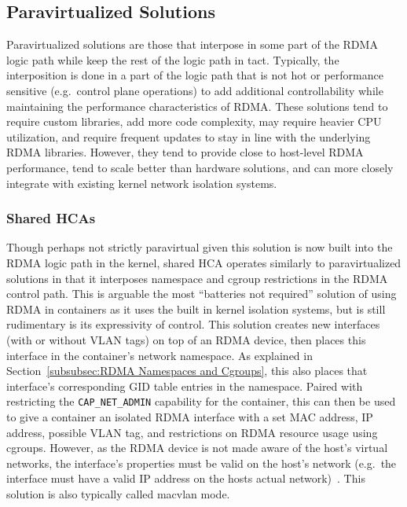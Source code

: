 \documentclass[12pt,titlepage]{article}
\begin{document}
\subsection{Paravirtualized Solutions}
Paravirtualized solutions are those that interpose in some part of the RDMA logic path while keep the rest of the logic path in tact.
Typically, the interposition is done in a part of the logic path that is not hot or performance sensitive (e.g.\ control plane operations) to add additional controllability while maintaining the performance characteristics of RDMA\@.
These solutions tend to require custom libraries, add more code complexity, may require heavier CPU utilization, and require frequent updates to stay in line with the underlying RDMA libraries.
However, they tend to provide close to host-level RDMA performance, tend to scale better than hardware solutions, and can more closely integrate with existing kernel network isolation systems.

\subsubsection{Shared HCAs}
Though perhaps not strictly paravirtual given this solution is now built into the RDMA logic path in the kernel, shared HCA operates similarly to paravirtualized solutions in that it interposes namespace and cgroup restrictions in the RDMA control path.
This is arguable the most ``batteries not required'' solution of using RDMA in containers as it uses the built in kernel isolation systems, but is still rudimentary is its expressivity of control.
This solution creates new interfaces (with or without VLAN tags) on top of an RDMA device, then places this interface in the container's network namespace.
As explained in Section~\ref{subsubsec:RDMA Namespaces and Cgroups}, this also places that interface's corresponding GID table entries in the namespace.
Paired with restricting the \texttt{CAP\_NET\_ADMIN} capability for the container, this can then be used to give a container an isolated RDMA interface with a set MAC address, IP address, possible VLAN tag, and restrictions on RDMA resource usage using cgroups.
However, as the RDMA device is not made aware of the host's virtual networks, the interface's properties must be valid on the host's network (e.g.\ the interface must have a valid IP address on the hosts actual network)~\cite{mellanoxdockermacvlan,dockermacvlan}.
This solution is also typically called macvlan mode.
\end{document}

